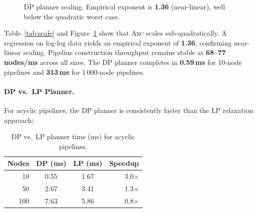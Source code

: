 \documentclass[sigplan,screen,nonacm]{acmart}
\newcommand{\arc}{\textsc{Arc}\xspace}
\begin{document}
\begin{figure}[t]
\centering
\caption{DP planner scaling.  Empirical exponent is \textbf{1.36} (near-linear),
  well below the quadratic worst case.}
\label{fig:scaling}
\end{figure}

Table~\ref{tab:scale} and Figure~\ref{fig:scaling} show that \arc scales
sub-quadratically.  A regression on log-log data yields an empirical
exponent of \textbf{1.36}, confirming near-linear scaling.  Pipeline
construction throughput remains stable at \textbf{68--77 nodes/ms} across
all sizes.  The DP planner completes in \textbf{0.59\,ms} for 10-node
pipelines and \textbf{313\,ms} for 1\,000-node pipelines.

\paragraph{DP vs.\ LP Planner.}
For acyclic pipelines, the DP planner is consistently faster than the LP
relaxation approach:

\begin{table}[t]
\caption{DP vs.\ LP planner time (ms) for acyclic pipelines.}
\label{tab:dpvslp}
\centering\small
\begin{tabular}{@{}rccr@{}}
\toprule
\textbf{Nodes} & \textbf{DP (ms)} & \textbf{LP (ms)} &
  \textbf{Speedup} \\
\midrule
10   & 0.55  & 1.67   & 3.0$\times$ \\
50   & 2.67  & 3.41   & 1.3$\times$ \\
100  & 7.63  & 5.86   & 0.8$\times$ \\
\bottomrule
\end{tabular}
\end{table}
\end{document}
